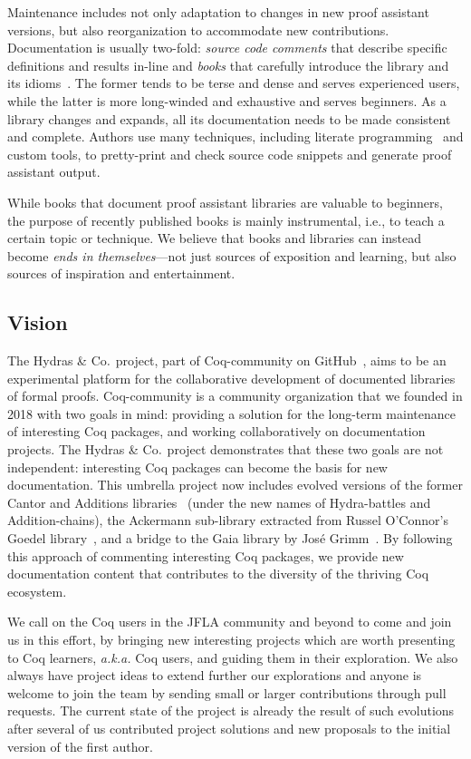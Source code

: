 \documentclass{easychair}
\newcommand{\coq}{Coq\xspace}
\newcommand{\community}{Coq-community\xspace}
\newcommand{\gaia}{Gaia\xspace}
\newcommand{\Hydras}{Hydras \& Co$\text.$\xspace}
\begin{document}
Maintenance includes not only adaptation to changes in new proof assistant versions, but also reorganization to accommodate new contributions. Documentation is usually two-fold: \emph{source code comments} that describe specific definitions and results in-line and \emph{books} that carefully introduce the library and its idioms~\cite{MCB,TheoremProvingLean4}. The former tends to be terse and dense and serves experienced users, while the latter is more long-winded and exhaustive and serves beginners. As a library changes and expands, all its documentation needs to be made consistent and complete. Authors use many techniques, including literate programming~\cite{Knuth1984} and custom tools, to pretty-print and check source code snippets and generate proof assistant output.

While books that document proof assistant libraries are valuable to beginners, the purpose of recently published books is mainly instrumental, i.e., to teach a certain topic or technique. We believe that books and libraries can instead become \emph{ends in themselves}---not just sources of exposition and learning, but also sources of inspiration and entertainment.

\subsection{Vision}
The \Hydras project, part of \community on GitHub~\cite{CoqCommunity}, aims to be an experimental platform for the collaborative development of documented libraries of formal proofs. \community is a community organization that we founded in 2018 with two goals in mind: providing a solution for the long-term maintenance of interesting \coq packages, and working collaboratively on documentation projects. The \Hydras project demonstrates that these two goals are not independent: interesting \coq packages can become the basis for new documentation.
%
This umbrella project now includes evolved versions of the former Cantor and Additions libraries~\cite{CantorContrib,AdditionsContrib} (under the new names of Hydra-battles and Addition-chains), the Ackermann sub-library extracted from Russel O'Connor's Goedel library~\cite{OConnor05, Goedel}, and a bridge to the \gaia library by José Grimm~\cite{Gaia,grimm:hal-00911710}.
%
By following this approach of commenting interesting \coq packages, we provide new documentation content that contributes to the diversity of the thriving \coq ecosystem.

We call on the \coq users in the JFLA community and beyond to come and join us in this effort, by bringing new interesting projects which are worth presenting to \coq learners, \emph{a.k.a.} \coq users, and guiding them in their exploration.
%
We also always have project ideas to extend further our explorations and anyone is welcome to join the team by sending small or larger contributions through pull requests.
%
The current state of the project is already the result of such evolutions after several of us contributed project solutions and new proposals to the initial version of the first author.
\end{document}
